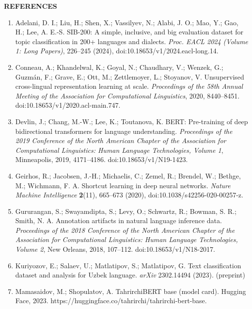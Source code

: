 \documentclass[11pt]{book}
\begin{document}
\begin{center}\textbf{REFERENCES}\end{center}
\begin{enumerate}

\item Adelani, D. I.; Liu, H.; Shen, X.; Vassilyev, N.; Alabi, J. O.; Mao, Y.; Gao, H.; Lee, A. E.-S. SIB-200: A simple, inclusive, and big evaluation dataset for topic classification in 200+ languages and dialects. {\em Proc. EACL 2024 (Volume 1: Long Papers)}, 226--245 (2024), doi:10.18653/v1/2024.eacl-long.14.

\item Conneau, A.; Khandelwal, K.; Goyal, N.; Chaudhary, V.; Wenzek, G.; Guzm\'an, F.; Grave, E.; Ott, M.; Zettlemoyer, L.; Stoyanov, V. Unsupervised cross-lingual representation learning at scale. {\em Proceedings of the 58th Annual Meeting of the Association for Computational Linguistics}, 2020, 8440--8451. doi:10.18653/v1/2020.acl-main.747.

\item Devlin, J.; Chang, M.-W.; Lee, K.; Toutanova, K. BERT: Pre-training of deep bidirectional transformers for language understanding. {\em Proceedings of the 2019 Conference of the North American Chapter of the Association for Computational Linguistics: Human Language Technologies, Volume 1}, Minneapolis, 2019, 4171--4186. doi:10.18653/v1/N19-1423.

\item Geirhos, R.; Jacobsen, J.-H.; Michaelis, C.; Zemel, R.; Brendel, W.; Bethge, M.; Wichmann, F. A. Shortcut learning in deep neural networks. {\em Nature Machine Intelligence} \textbf{2}(11), 665--673 (2020), doi:10.1038/s42256-020-00257-z.

\item Gururangan, S.; Swayamdipta, S.; Levy, O.; Schwartz, R.; Bowman, S. R.; Smith, N. A. Annotation artifacts in natural language inference data. {\em Proceedings of the 2018 Conference of the North American Chapter of the Association for Computational Linguistics: Human Language Technologies, Volume 2}, New Orleans, 2018, 107--112. doi:10.18653/v1/N18-2017.

\item Kuriyozov, E.; Salaev, U.; Matlatipov, S.; Matlatipov, G. Text classification dataset and analysis for Uzbek language. {\em arXiv} 2302.14494 (2023). (preprint)

\item Mamasaidov, M.; Shopulatov, A. TahrirchiBERT base (model card). Hugging Face, 2023. https://huggingface.co/tahrirchi/tahrirchi-bert-base.


\end{enumerate}
\end{document}
